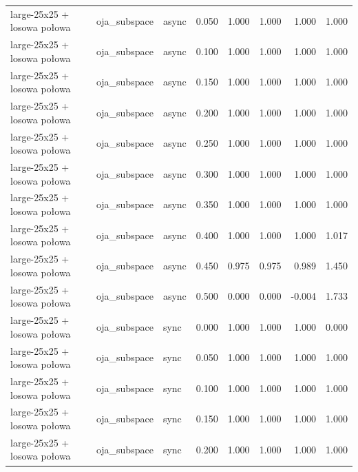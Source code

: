 \begin{tabular}{lllrrrrr}
large-25x25 + losowa połowa & oja\_subspace & async & 0.050 & 1.000 & 1.000 & 1.000 & 1.000 \\

large-25x25 + losowa połowa & oja\_subspace & async & 0.100 & 1.000 & 1.000 & 1.000 & 1.000 \\

large-25x25 + losowa połowa & oja\_subspace & async & 0.150 & 1.000 & 1.000 & 1.000 & 1.000 \\

large-25x25 + losowa połowa & oja\_subspace & async & 0.200 & 1.000 & 1.000 & 1.000 & 1.000 \\

large-25x25 + losowa połowa & oja\_subspace & async & 0.250 & 1.000 & 1.000 & 1.000 & 1.000 \\

large-25x25 + losowa połowa & oja\_subspace & async & 0.300 & 1.000 & 1.000 & 1.000 & 1.000 \\

large-25x25 + losowa połowa & oja\_subspace & async & 0.350 & 1.000 & 1.000 & 1.000 & 1.000 \\

large-25x25 + losowa połowa & oja\_subspace & async & 0.400 & 1.000 & 1.000 & 1.000 & 1.017 \\

large-25x25 + losowa połowa & oja\_subspace & async & 0.450 & 0.975 & 0.975 & 0.989 & 1.450 \\

large-25x25 + losowa połowa & oja\_subspace & async & 0.500 & 0.000 & 0.000 & -0.004 & 1.733 \\

large-25x25 + losowa połowa & oja\_subspace & sync & 0.000 & 1.000 & 1.000 & 1.000 & 0.000 \\

large-25x25 + losowa połowa & oja\_subspace & sync & 0.050 & 1.000 & 1.000 & 1.000 & 1.000 \\

large-25x25 + losowa połowa & oja\_subspace & sync & 0.100 & 1.000 & 1.000 & 1.000 & 1.000 \\

large-25x25 + losowa połowa & oja\_subspace & sync & 0.150 & 1.000 & 1.000 & 1.000 & 1.000 \\

large-25x25 + losowa połowa & oja\_subspace & sync & 0.200 & 1.000 & 1.000 & 1.000 & 1.000 \\


\end{tabular}
